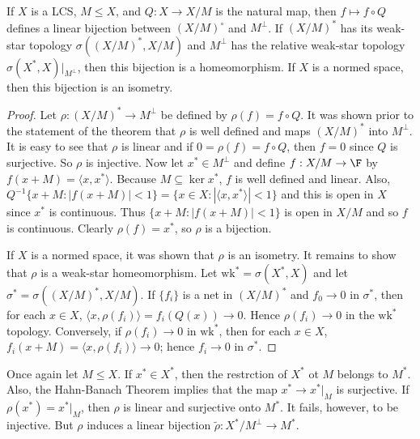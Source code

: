 \begin{thm}
    If $X$ is a LCS, $M \leq X$, and $Q:X\rightarrow X/M$ is the natural map, then $f\mapsto f\circ Q$ defines a linear bijection between $(X/M)^{\circ}$ and $M^{\perp}$. If $(X/M)^*$ has its weak-star topology $\sigma((X/M)^*,X/M)$ and $M^{\perp}$ has the relative weak-star topology $\sigma(X^*,X)\vert_{M^{\perp}}$, then this bijection is a homeomorphism. If $X$ is a normed space, then this bijection is an isometry.
\end{thm}
\begin{proof}
    Let $\rho:(X/M)^*\rightarrow M^{\perp}$ be defined by $\rho(f) = f\circ Q$. It was shown prior to the statement of the theorem that $\rho$ is well defined and maps $(X/M)^*$ into $M^{\perp}$. It is easy to see that $\rho$ is linear and if $0 = \rho(f) = f\circ Q$, then $f = 0$ since $Q$ is surjective. So $\rho$ is injective. Now let $x^* \in M^{\perp}$ and define $f:X/M\rightarrow \F$ by $f(x+M)=\langle x,x^*\rangle$. Because $M \subseteq \ker x^*$, $f$ is well defined and linear. Also, $Q^{-1}\{x+M:|f(x+M)|< 1 \} = \{x \in X:|\langle x,x^*\rangle| < 1\}$ and this is open in $X$ since $x^*$ is continuous. Thus $\{x+M:|f(x+M)| < 1\}$ is open in $X/M$ and so $f$ is continuous. Clearly $\rho(f) = x^*$, so $\rho$ is a bijection.

    If $X$ is a normed space, it was shown that $\rho$ is an isometry. It remains to show that $\rho$ is a weak-star homeomorphism. Let $\text{wk}^* = \sigma(X^*,X)$ and let $\sigma^* = \sigma((X/M)^*,X/M)$. If $\{f_i\}$ is a net in $(X/M)^*$ and $f_0\rightarrow 0$ in $\sigma^*$, then for each $x \in X$, $\langle x,\rho(f_i)\rangle = f_i(Q(x))\rightarrow 0$. Hence $\rho(f_i)\rightarrow 0$ in the $\text{wk}^*$ topology. Conversely, if $\rho(f_i)\rightarrow 0$ in $\text{wk}^*$, then for each $x \in X$, $f_i(x+M) = \langle x,\rho(f_i)\rangle \rightarrow 0$; hence $f_i\rightarrow 0$ in $\sigma^*$.
\end{proof}

Once again let $M \leq X$. If $x^* \in X^*$, then the restrction of $X^*$ ot $M$ belongs to $M^*$. Also, the Hahn-Banach Theorem implies that the map $x^*\rightarrow x^*\vert_M$ is surjective. If $\rho(x^*) = x^*\vert_M$, then $\rho$ is linear and surjective onto $M^*$. It fails, however, to be injective. But $\rho$ induces a linear bijection $\widetilde{\rho}:X^*/M^{\perp}\rightarrow M^*$.

